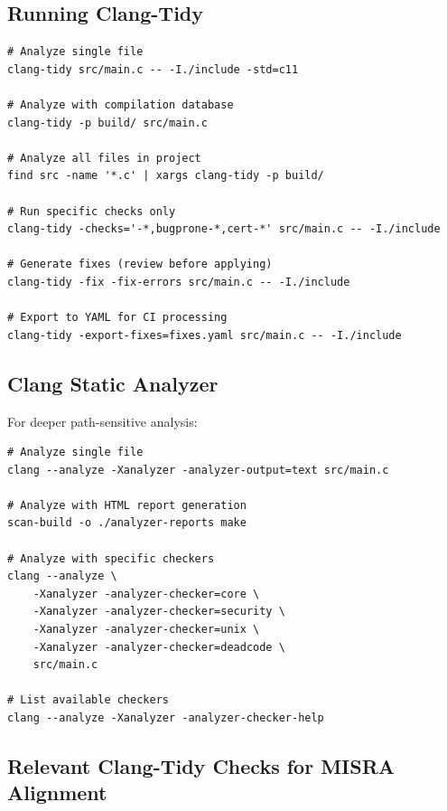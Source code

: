 \documentclass[11pt,letterpaper]{report}
\begin{document}
\subsection{Running Clang-Tidy}

\begin{verbatim}
# Analyze single file
clang-tidy src/main.c -- -I./include -std=c11

# Analyze with compilation database
clang-tidy -p build/ src/main.c

# Analyze all files in project
find src -name '*.c' | xargs clang-tidy -p build/

# Run specific checks only
clang-tidy -checks='-*,bugprone-*,cert-*' src/main.c -- -I./include

# Generate fixes (review before applying)
clang-tidy -fix -fix-errors src/main.c -- -I./include

# Export to YAML for CI processing
clang-tidy -export-fixes=fixes.yaml src/main.c -- -I./include
\end{verbatim}

\subsection{Clang Static Analyzer}

For deeper path-sensitive analysis:

\begin{verbatim}
# Analyze single file
clang --analyze -Xanalyzer -analyzer-output=text src/main.c

# Analyze with HTML report generation
scan-build -o ./analyzer-reports make

# Analyze with specific checkers
clang --analyze \
    -Xanalyzer -analyzer-checker=core \
    -Xanalyzer -analyzer-checker=security \
    -Xanalyzer -analyzer-checker=unix \
    -Xanalyzer -analyzer-checker=deadcode \
    src/main.c

# List available checkers
clang --analyze -Xanalyzer -analyzer-checker-help
\end{verbatim}

\subsection{Relevant Clang-Tidy Checks for MISRA Alignment}
\end{document}
